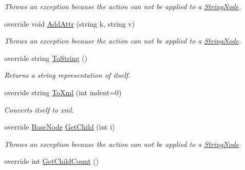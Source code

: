 \begin{DoxyCompactItemize}
\begin{DoxyCompactList}\small\item\em Throws an exception because the action can not be applied to a \hyperlink{class_x_m_leru_handleru_1_1_string_node}{String\+Node}. \end{DoxyCompactList}\item 
\hypertarget{class_x_m_leru_handleru_1_1_string_node_ad90914dceb59dd26271f5266b2d899ca}{}override void \hyperlink{class_x_m_leru_handleru_1_1_string_node_ad90914dceb59dd26271f5266b2d899ca}{Add\+Attr} (string k, string v)\label{class_x_m_leru_handleru_1_1_string_node_ad90914dceb59dd26271f5266b2d899ca}

\begin{DoxyCompactList}\small\item\em Throws an exception because the action can not be applied to a \hyperlink{class_x_m_leru_handleru_1_1_string_node}{String\+Node}. \end{DoxyCompactList}\item 
override string \hyperlink{class_x_m_leru_handleru_1_1_string_node_aeefff8d4054ec20dc817b7cda8130cd6}{To\+String} ()
\begin{DoxyCompactList}\small\item\em Returns a string representation of itself. \end{DoxyCompactList}\item 
override string \hyperlink{class_x_m_leru_handleru_1_1_string_node_ac8507d872f9ad6789758b080894ad78f}{To\+Xml} (int indent=0)
\begin{DoxyCompactList}\small\item\em Converts itself to xml. \end{DoxyCompactList}\item 
\hypertarget{class_x_m_leru_handleru_1_1_string_node_a4b06ece089aaaaa5b5d77fd4768ff12b}{}override \hyperlink{class_x_m_leru_handleru_1_1_base_node}{Base\+Node} \hyperlink{class_x_m_leru_handleru_1_1_string_node_a4b06ece089aaaaa5b5d77fd4768ff12b}{Get\+Child} (int i)\label{class_x_m_leru_handleru_1_1_string_node_a4b06ece089aaaaa5b5d77fd4768ff12b}

\begin{DoxyCompactList}\small\item\em Throws an exception because the action can not be applied to a \hyperlink{class_x_m_leru_handleru_1_1_string_node}{String\+Node}. \end{DoxyCompactList}\item 
\hypertarget{class_x_m_leru_handleru_1_1_string_node_ac603663bb62e5c3dbb4f99b5167c6ba6}{}override int \hyperlink{class_x_m_leru_handleru_1_1_string_node_ac603663bb62e5c3dbb4f99b5167c6ba6}{Get\+Child\+Count} ()\label{class_x_m_leru_handleru_1_1_string_node_ac603663bb62e5c3dbb4f99b5167c6ba6}


\end{DoxyCompactItemize}
